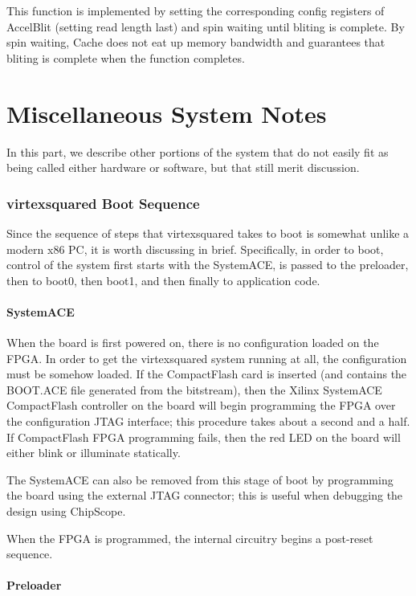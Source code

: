 \documentclass[10pt]{article}
\begin{document}
This function is implemented by setting the corresponding config registers of AccelBlit (setting read length last) and spin waiting until bliting is complete. By spin waiting, Cache does not eat up memory bandwidth and guarantees that bliting is complete when the function completes. 

\part{Miscellaneous System Notes}

In this part, we describe other portions of the system that do not easily
fit as being called either hardware or software, but that still merit
discussion.

\section{virtexsquared Boot Sequence}
\label{sec:boot}

Since the sequence of steps that virtexsquared takes to boot is somewhat
unlike a modern x86 PC, it is worth discussing in brief. Specifically, in
order to boot, control of the system first starts with the SystemACE, is
passed to the preloader, then to boot0, then boot1, and then finally to
application code.

\subsection{SystemACE}

When the board is first powered on, there is no configuration loaded on the
FPGA. In order to get the virtexsquared system running at all, the
configuration must be somehow loaded. If the CompactFlash card is inserted
(and contains the BOOT.ACE file generated from the bitstream), then the
Xilinx SystemACE CompactFlash controller on the board will begin programming
the FPGA over the configuration JTAG interface; this procedure takes about a
second and a half. If CompactFlash FPGA programming fails, then the red LED
on the board will either blink or illuminate statically.

The SystemACE can also be removed from this stage of boot by programming the
board using the external JTAG connector; this is useful when debugging the
design using ChipScope.

When the FPGA is programmed, the internal circuitry begins a post-reset
sequence.

\subsection{Preloader}
\end{document}
